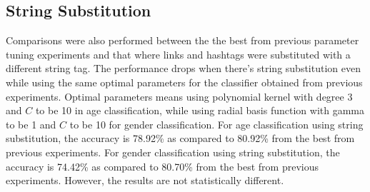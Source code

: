 \documentclass[a4paper]{llncs}
\begin{document}


\subsection{String Substitution}
Comparisons were also performed between the the best from previous parameter tuning experiments and that where links and hashtags were substituted with a different string tag. The performance drops when there's string substitution even while using the same optimal parameters for the classifier obtained from previous experiments. Optimal parameters means using polynomial kernel with degree 3 and $C$ to be 10 in age classification, while using radial basis function with gamma to be 1 and $C$ to be 10 for gender classification. For age classification using string substitution, the accuracy is 78.92\% as compared to 80.92\% from the best from previous experiments. For gender classification using string substitution, the accuracy is 74.42\% as compared to 80.70\% from the best from previous experiments. However, the results are not statistically different.
\end{document}
